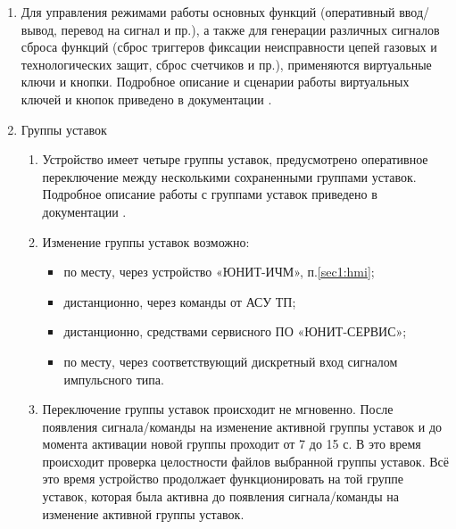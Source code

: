 \begin{enumerate}[label=\arabic{section}.\arabic{subsection}.\arabic*, labelsep=4pt, leftmargin=0pt, itemindent=57pt]
\item
Для управления режимами работы основных функций (оперативный ввод/вывод, перевод на сигнал и пр.), а также для генерации различных сигналов сброса функций (сброс триггеров фиксации неисправности цепей газовых и технологических защит, сброс счетчиков и пр.), применяются виртуальные ключи и кнопки.
Подробное описание и сценарии работы виртуальных ключей и кнопок приведено в документации \ManualUnitGeneral. 

\item Группы уставок
\begin{enumerate}[label=\arabic{section}.\arabic{subsection}.\arabic{enumi}.\arabic*, labelsep=4pt, leftmargin=0em, itemindent=65pt, parsep=0pt]

\item Устройство имеет четыре группы уставок, предусмотрено оперативное переключение между несколькими сохраненными группами уставок. Подробное описание работы с группами уставок приведено в документации \ManualUnitGeneral.

\item
Изменение группы уставок возможно:
\begin{itemize}
    \item по месту, через устройство «ЮНИТ-ИЧМ», п.\ref{sec1:hmi};
    \item дистанционно, через команды от АСУ ТП;
    \item дистанционно, средствами сервисного ПО «ЮНИТ-СЕРВИС»;
    \item по месту, через соответствующий дискретный вход сигналом импульсного типа.
\end{itemize}

\item
Переключение группы уставок происходит не мгновенно.
После появления сигнала/команды на изменение активной группы уставок и до момента активации новой группы проходит от 7 до 15 с.
В это время происходит проверка целостности файлов выбранной группы уставок.
Всё это время устройство продолжает функционировать на той группе уставок, которая была активна до появления сигнала/команды на изменение активной группы уставок.

\end{enumerate}


\end{enumerate}

